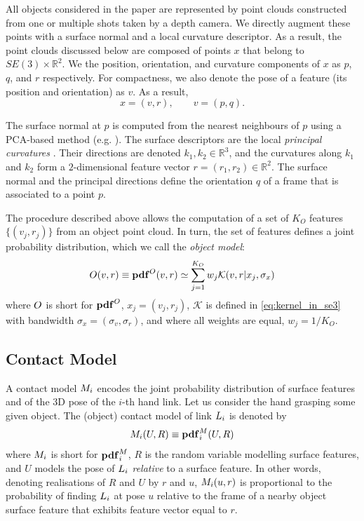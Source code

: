 All objects considered in the paper are represented by point clouds constructed from one or multiple shots taken by a depth camera. We directly augment these points with a surface normal and a local curvature descriptor. As a result, the point clouds discussed below are composed of points $x$ that belong to $SE(3) \times \mathbb R^2$. We the position, orientation, and curvature components of $x$ as $p$, $q$, and $r$ respectively. For compactness, we also denote the pose of a feature (its position and orientation) as $v$. As a result,
\begin{equation}
x = (v, r), \qquad v = (p, q).
\label{eq:surface.feature}
\end{equation}

The surface normal at $p$ is computed from the nearest neighbours of $p$ using a PCA-based method (e.g. \citep{kanatani2005statistical}). The surface descriptors are the local \emph{principal curvatures} \citep{spivak1979comprehensive}. Their directions are denoted $k_1, k_2 \in \mathbb R^3$, and the curvatures along $k_1$ and $k_2$ form a $2$-dimensional feature vector $r = (r_1, r_2) \in \mathbb R^2$. %
The surface normal and the principal directions define the orientation $q$ of a frame that is associated to a point $p$. 

The procedure described above allows the computation of a set of $K_O$ features  $\lbrace (v_j, r_j) \rbrace$ from an object point cloud. In turn, the set of features defines a joint probability distribution, which we call the \emph{object model}:
\begin{equation}
O(v, r) \equiv \mathbf{pdf}^O(v, r) \simeq \sum_{j=1}^{K_O} w_j \mathcal{K}(v, r|{x_j}, \sigma_{x})
\label{eq:om}
\end{equation}
where $O$ is short for $\mathbf{pdf}^O$, $x_j = (v_j, r_j)$,  $\mathcal{K}$ is defined in \eq\eqref{eq:kernel_in_se3} with bandwidth $\sigma_{x} = (\sigma_{v}, \sigma_{r})$, and where all weights are equal, $w_j = 1/{K_O}$.

\subsection{Contact Model}\label{sec:contact.model}

A contact model $M_i$ encodes the joint probability distribution of surface features and of the 3D pose of the $i$-th hand link. Let us consider the hand grasping some given object. The (object) contact model of link $L_i$ is denoted by
\begin{equation}\label{eq:M}
M_i(U, R) \equiv \mathbf{pdf}^M_i(U, R)
\end{equation}
where $M_i$ is short for $\mathbf{pdf}^M_i$, $R$ is the random variable modelling surface features, and $U$ models the pose of $L_i$ \emph{relative} to a surface feature. In other words, denoting realisations of $R$ and $U$ by $r$ and $u$, $M_i(u, r)$ is proportional to the probability of finding $L_i$ at pose $u$ relative to the frame of a nearby object surface feature that exhibits feature vector equal to $r$.

